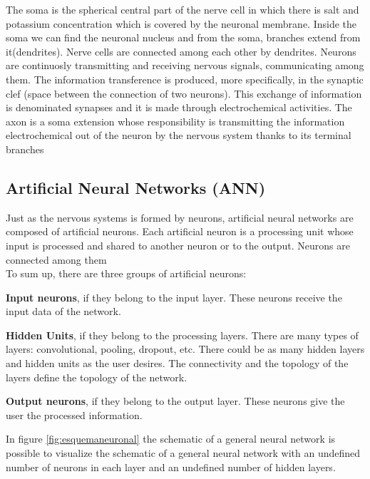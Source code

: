 The soma is the spherical central part of the nerve cell in which there is  salt and potassium concentration which is covered by the neuronal membrane. Inside the soma we can find the neuronal nucleus and from the soma, branches  extend  from it(dendrites). Nerve cells are connected among each other by dendrites. Neurons are continuosly transmitting and receiving nervous signals, communicating among them. The information transference is produced, more specifically, in the synaptic clef (space between the connection of two neurons). This exchange of information is denominated synapses and it is made through electrochemical activities. The axon is a soma extension whose responsibility is transmitting the information electrochemical out of the neuron by the nervous system thanks to its terminal branches \cite{BINN, neuroscience}\\

\subsection{Artificial Neural Networks (ANN)}
Just as the nervous systems is formed by neurons, artificial neural networks are composed of artificial neurons. Each artificial neuron is a processing unit whose input is processed and shared to another neuron or to the output. Neurons are connected among them \cite{BINN}\\

To sum up, there are three groups of artificial neurons:
\begin{description}[itemsep=2pt,topsep=8pt,parsep=0pt,partopsep=20pt]
\item \textbf{Input neurons}, if they belong to the input layer. These neurons receive the input data of the network.
\item \textbf{Hidden Units}, if they belong to the processing layers. There are many types of layers: convolutional, pooling, dropout, etc. There could be as many hidden layers and hidden units as the user desires. The connectivity and the topology of the layers define the topology of the network.
\item \textbf{Output neurons}, if they belong to the output layer. These neurons give the user the processed information.
\end{description}

In figure \ref{fig:esquemaneuronal} the schematic of a general neural network  is possible to visualize the schematic of a general neural network with an undefined number of neurons in each layer and an undefined number of hidden layers.\\

